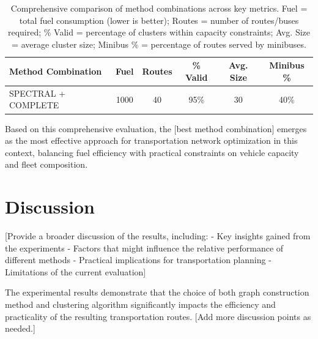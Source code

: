 \begin{table}[!htbp]
\centering
\footnotesize{
\begin{tabular}{lccccc}
\toprule
\textbf{Method Combination} & \textbf{Fuel} & \textbf{Routes} & \textbf{\% Valid} & \textbf{Avg. Size} & \textbf{Minibus \%} \\
\midrule
SPECTRAL + COMPLETE & 1000 & 40 & 95\% & 30 & 40\% \\
\bottomrule
\end{tabular}
}
\caption{Comprehensive comparison of method combinations across key metrics. Fuel = total fuel consumption (lower is better); Routes = number of routes/buses required; \% Valid = percentage of clusters within capacity constraints; Avg. Size = average cluster size; Minibus \% = percentage of routes served by minibuses.}
\label{tab:method_comparison}
\end{table}

Based on this comprehensive evaluation, the [best method combination] emerges as the most effective approach for transportation network optimization in this context, balancing fuel efficiency with practical constraints on vehicle capacity and fleet composition.

\section{Discussion}
\label{sec:discussion}

[Provide a broader discussion of the results, including:
- Key insights gained from the experiments
- Factors that might influence the relative performance of different methods
- Practical implications for transportation planning
- Limitations of the current evaluation]

The experimental results demonstrate that the choice of both graph construction method and clustering algorithm significantly impacts the efficiency and practicality of the resulting transportation routes. [Add more discussion points as needed.]



